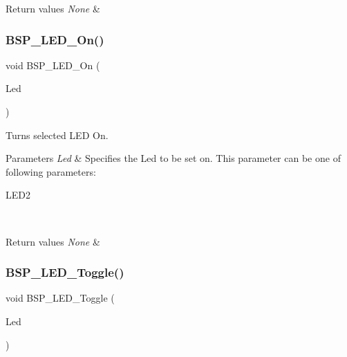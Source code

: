 \begin{DoxyRetVals}{Return values}
{\em None} & \\
\hline
\end{DoxyRetVals}
\mbox{\label{group___s_t_m32_f0_x_x___n_u_c_l_e_o___l_e_d___functions_gaee9c16b16384834c69efabf58f423d6f}} 
\subsubsection{\texorpdfstring{B\+S\+P\+\_\+\+L\+E\+D\+\_\+\+On()}{BSP\_LED\_On()}}
{\footnotesize\ttfamily void B\+S\+P\+\_\+\+L\+E\+D\+\_\+\+On (\begin{DoxyParamCaption}\item[{Led\+\_\+\+Type\+Def}]{Led }\end{DoxyParamCaption})}



Turns selected L\+ED On. 


\begin{DoxyParams}{Parameters}
{\em Led} & Specifies the Led to be set on. This parameter can be one of following parameters\+: \begin{DoxyItemize}
\item L\+E\+D2 \end{DoxyItemize}
\\
\hline
\end{DoxyParams}

\begin{DoxyRetVals}{Return values}
{\em None} & \\
\hline
\end{DoxyRetVals}
\mbox{\label{group___s_t_m32_f0_x_x___n_u_c_l_e_o___l_e_d___functions_ga1b9eabba7d498f41d6f16587ec0f9732}} 
\subsubsection{\texorpdfstring{B\+S\+P\+\_\+\+L\+E\+D\+\_\+\+Toggle()}{BSP\_LED\_Toggle()}}
{\footnotesize\ttfamily void B\+S\+P\+\_\+\+L\+E\+D\+\_\+\+Toggle (\begin{DoxyParamCaption}\item[{Led\+\_\+\+Type\+Def}]{Led }\end{DoxyParamCaption})}



